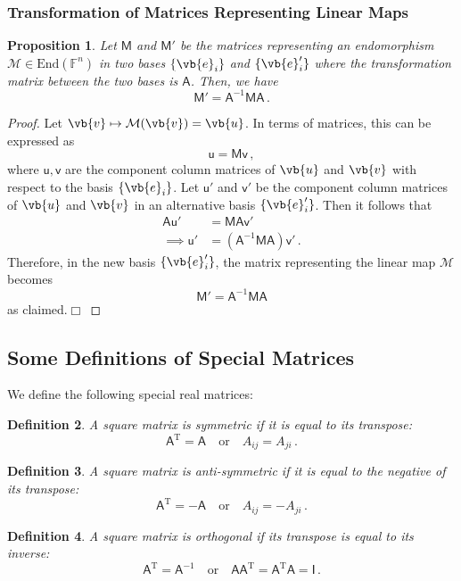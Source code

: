 \documentclass{article}
\theoremstyle{plain}\theoremheaderfont{\normalfont\itshape}\theorembodyfont{\rmfamily}\theoremseparator{.}\newtheorem*{rem}{Remark}\newtheorem*{ex}{Example}\newtheorem*{proof}{Proof}\newtheorem*{altp}{Alternative proof}
\theoremstyle{plain}\theoremheaderfont{\normalfont\bfseries}\theorembodyfont{\rmfamily}\theoremseparator{.}\newtheorem{thm}{Theorem}[section]\newtheorem{lem}[thm]{Lemma}\newtheorem{prop}[thm]{Proposition}\newtheorem*{cor}{Corollary}\newtheorem{defn}[thm]{Definition}\newtheorem{clm}[thm]{Claim}\newtheorem{clminproof}{Claim}
\theoremstyle{break}\theoremheaderfont{\normalfont\itshape}\theorembodyfont{\rmfamily}\theoremseparator{.\medskip}\newtheorem*{proofskip}{Proof}\newtheorem*{exs}{Examples}\newtheorem*{rems}{Remarks}
\theoremstyle{break}\theoremheaderfont{\normalfont\bfseries}\theorembodyfont{\rmfamily}\theoremseparator{.\medskip}\newtheorem{lemskip}[thm]{Lemma}\newtheorem{defnskip}[thm]{Definition}\newtheorem{propskip}[thm]{Proposition}\newtheorem{thmskip}[thm]{Theorem}
\numberwithin{equation}{section}
\newcommand{\qed}{\hfill\ensuremath{\Box}}
\begin{document}
	\subsubsection{Transformation of Matrices Representing Linear Maps}
	\begin{prop}
		Let \(\mathsf{M}\) and \(\mathsf{M}'\) be the matrices representing an endomorphism \(\mathcal{M}\in\mathrm{End}(\mathbb{F}^n)\) in two bases \(\{\vb{e}_i\}\) and \(\{\vb{e}_i'\}\) where the transformation matrix between the two bases is \(\mathsf{A}\). Then,
		we have
		\[\mathsf{M}'=\mathsf{A}^{-1}\mathsf{MA}\,.\]
	\end{prop}
	\begin{proof}
		Let \(\vb{v}\mapsto\mathcal{M}(\vb{v})=\vb{u}\). In terms of matrices, this can be expressed as
		\[\mathsf{u}=\mathsf{Mv}\,,\]
		where \(\mathsf{u,v}\) are the component column matrices of \(\vb{u}\) and \(\vb{v}\) with respect to the basis \(\{\vb{e}_i\}\). Let \(\mathsf{u}'\) and \(\mathsf{v}'\) be the component column matrices of \(\vb{u}\) and \(\vb{v}\) in an alternative basis \(\{\vb{e}_i'\}\). Then it follows that
		\begin{align*}
			\mathsf{Au}'&=\mathsf{MAv}'\\
			\implies\mathsf{u}'&=(\mathsf{A}^{-1}\mathsf{MA})\mathsf{v}'\,.
		\end{align*}
		Therefore, in the new basis \(\{\vb{e}_i'\}\), the matrix representing the linear map \(\mathcal{M}\) becomes
		\[\mathsf{M}'=\mathsf{A}^{-1}\mathsf{MA}\]
		as claimed.\qed
	\end{proof}
	
	\subsection{Some Definitions of Special Matrices}
	We define the following special real matrices:
	
	\begin{defn}
		A square matrix is \textit{symmetric} if it is equal to its transpose:
		\[\mathsf{A}^{\mathrm{T}}=\mathsf{A}\quad\text{or}\quad A_{ij}=A_{ji}\,.\]
	\end{defn}
	\begin{defn}
		A square matrix is \textit{anti-symmetric} if it is equal to the negative of its transpose:
		\[\mathsf{A}^{\mathrm{T}}=-\mathsf{A}\quad\text{or}\quad A_{ij}=-A_{ji}\,.\]
	\end{defn}
	\begin{defn}
		A square matrix is \textit{orthogonal} if its transpose is equal to its inverse:
		\[\mathsf{A}^{\mathrm{T}}=\mathsf{A}^{-1}\quad\text{or}\quad \mathsf{AA}^{\mathrm{T}}=\mathsf{A}^{\mathrm{T}}\mathsf{A}=\mathsf{I}\,.\]
	\end{defn}
\end{document}
